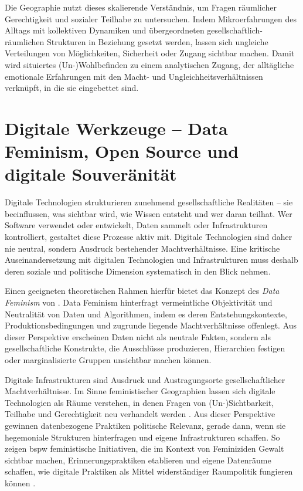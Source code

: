 Die Geographie nutzt dieses skalierende Verständnis, um Fragen räumlicher Gerechtigkeit und sozialer Teilhabe zu untersuchen. Indem Mikroerfahrungen des Alltags mit kollektiven Dynamiken und übergeordneten gesellschaftlich-räumlichen Strukturen in Beziehung gesetzt werden, lassen sich ungleiche Verteilungen von Möglichkeiten, Sicherheit oder Zugang sichtbar machen. Damit wird situiertes (Un-)Wohlbefinden zu einem analytischen Zugang, der alltägliche emotionale Erfahrungen mit den Macht- und Ungleichheitsverhältnissen verknüpft, in die sie eingebettet sind.

\section{Digitale Werkzeuge -- Data Feminism, Open Source und digitale Souveränität}
\label{sec:datafeminism}

Digitale Technologien strukturieren zunehmend gesellschaftliche Realitäten -- sie beeinflussen, was sichtbar wird, wie Wissen entsteht und wer daran teilhat. Wer Software verwendet oder entwickelt, Daten sammelt oder Infrastrukturen kontrolliert, gestaltet diese Prozesse aktiv mit. Digitale Technologien sind daher nie neutral, sondern Ausdruck bestehender Machtverhältnisse. Eine kritische Auseinandersetzung mit digitalen Technologien und Infrastrukturen muss deshalb deren soziale und politische Dimension systematisch in den Blick nehmen.

Einen geeigneten theoretischen Rahmen hierfür bietet das Konzept des \textit{Data Feminism} von \textcite{dignazioDataFeminism2020}. Data Feminism hinterfragt vermeintliche Objektivität und Neutralität von Daten und Algorithmen, indem es deren Entstehungskontexte, Produktionsbedingungen und zugrunde liegende Machtverhältnisse offenlegt. Aus dieser Perspektive erscheinen Daten nicht als neutrale Fakten, sondern als gesellschaftliche Konstrukte, die Ausschlüsse produzieren, Hierarchien festigen oder marginalisierte Gruppen unsichtbar machen können.

Digitale Infrastrukturen sind Ausdruck und Austragungsorte gesellschaftlicher Machtverhältnisse. Im Sinne feministischer Geographien lassen sich digitale Technologien als Räume verstehen, in denen Fragen von (Un-)Sichtbarkeit, Teilhabe und Gerechtigkeit neu verhandelt werden \parencite{elwoodFeministDigitalGeographies2018}. Aus dieser Perspektive gewinnen datenbezogene Praktiken politische Relevanz, gerade dann, wenn sie hegemoniale Strukturen hinterfragen und eigene Infrastrukturen schaffen. So zeigen \gls{bspw} feministische Initiativen, die im Kontext von Feminiziden Gewalt sichtbar machen, Erinnerungspraktiken etablieren und eigene Datenräume schaffen, wie digitale Praktiken als Mittel widerständiger Raumpolitik fungieren können \parencite{dignazioGeographiesMissingData2024}.

